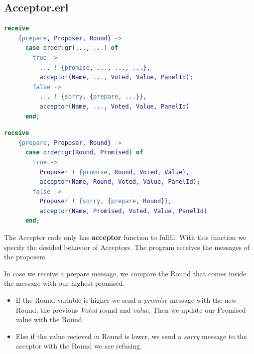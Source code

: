 \documentclass[a4paper, 10pt]{article}
\begin{document}
    

\subsection{Acceptor.erl}


    \begin{minipage}{.45\textwidth}
	\begin{lstlisting}[language=erlang, caption={Template}]
  receive
    {prepare, Proposer, Round} ->
      case order:gr(..., ...) of
        true ->
          ... ! {promise, ..., ..., ...},               
          acceptor(Name, ..., Voted, Value, PanelId);
        false ->
          ... ! {sorry, {prepare, ...}},
          acceptor(Name, ..., Voted, Value, PanelId)
      end;
	\end{lstlisting}
    \end{minipage}\hfill
    \begin{minipage}{.45\textwidth}
	\begin{lstlisting}[language=erlang, caption={Filled version}]
  receive
    {prepare, Proposer, Round} ->
      case order:gr(Round, Promised) of
        true ->
          Proposer ! {promise, Round, Voted, Value},               
          acceptor(Name, Round, Voted, Value, PanelId);
        false ->
          Proposer ! {sorry, {prepare, Round}},
          acceptor(Name, Promised, Voted, Value, PanelId)
      end;
	\end{lstlisting}
    \end{minipage}

    The Acceptor code only has \textbf{acceptor} function to fullfil. With this function we specify the desided behavior of Acceptors. The program receives the messages of the proposers. 

    In case we receive a prepare message, we compare the Round that comes inside the message with our highest promised. 
  \begin{itemize}
    \item If the Round variable is higher we send a \textit{promise} message with the new Round, the previous \textit{Voted} round and \textit{value}. Then we update our Promised value with the Round. 
    \item Else if the value recieved in Round is lower, we send a \textit{sorry} message to the acceptor with the Round we are refusing.
  \end{itemize}
\end{document}
